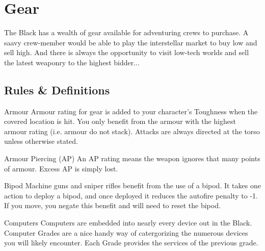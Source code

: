 
\section{Gear}
\label{sec:gear}

\begin{multicols}{2}

The Black has a wealth of gear available for adventuring crews to purchase. A saavy crew-member would be able to play the interstellar market to buy low and sell high. And there is always the opportunity to visit low-tech worlds and sell the latest weaponry to the highest bidder...

\subsection{Rules \& Definitions}
\label{sec:gear-rules}

\begin{genericsection}{Armour}
Armour rating for gear is added to your character's Toughness when the covered location is hit. You only benefit from the armour with the highest armour rating (i.e. armour do not stack). Attacks are always directed at the torso unless otherwise stated.
\end{genericsection}

\begin{genericsection}{Armour Piercing (AP)}
An AP rating means the weapon ignores that many points of armour. Excess AP is simply lost.
\end{genericsection}

\begin{genericsection}{Bipod}
Machine guns and sniper rifles benefit from the use of a bipod. It takes one action to deploy a bipod, and once deployed it reduces the autofire penalty to -1. If you move, you negate this benefit and will need to reset the bipod.
\end{genericsection}

\begin{genericsection}{Computers}
Computers are embedded into nearly every device out in the Black. Computer Grades are a nice handy way of catergorizing the numerous devices you will likely encounter. Each Grade provides the services of the previous grade.


\end{genericsection}


\end{multicols}
